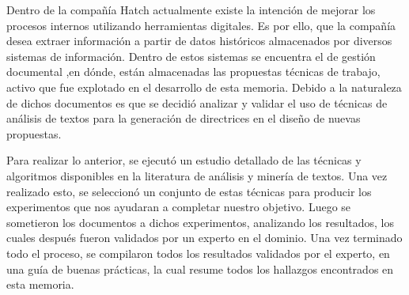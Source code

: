 Dentro de la compañía Hatch actualmente existe la intención de mejorar los procesos internos utilizando herramientas digitales. Es por ello, que la compañía desea extraer información a partir de datos históricos almacenados por diversos sistemas de información. Dentro de estos sistemas se encuentra el de gestión documental ,en dónde, están almacenadas las propuestas técnicas de trabajo, activo que fue explotado en el desarrollo de esta memoria. Debido a la naturaleza de dichos documentos es que se decidió analizar y validar el uso de técnicas de análisis de textos para la generación de directrices en el diseño de nuevas propuestas.

Para realizar lo anterior, se ejecutó un estudio detallado de las técnicas y algoritmos disponibles en la literatura de análisis y minería de textos. Una vez realizado esto, se seleccionó un conjunto de estas técnicas para producir los experimentos que nos ayudaran a completar nuestro objetivo. Luego se sometieron los documentos a dichos experimentos, analizando los resultados, los cuales después fueron validados por un experto en el dominio. Una vez terminado todo el proceso, se compilaron todos los resultados validados por el experto, en una guía de buenas prácticas, la cual resume todos los hallazgos encontrados en esta memoria. 

